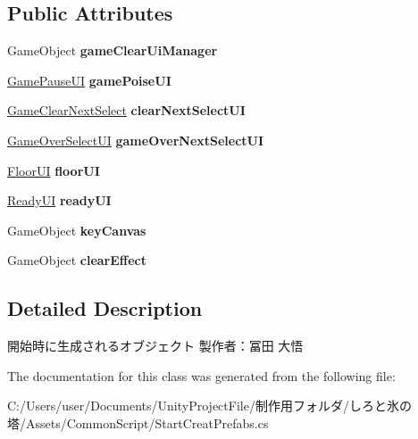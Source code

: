 \subsection*{Public Attributes}
\begin{DoxyCompactItemize}
\item 
\mbox{\label{class_start_creat_prefabs_af8de907bed0306e1273285eb06780123}} 
Game\+Object {\bfseries game\+Clear\+Ui\+Manager}
\item 
\mbox{\label{class_start_creat_prefabs_a4c5321b968367b810da7568fbf7a5613}} 
\hyperlink{class_game_pause_u_i}{Game\+Pause\+UI} {\bfseries game\+Poise\+UI}
\item 
\mbox{\label{class_start_creat_prefabs_a526c5fa91e8e605d8b53c68f52a23058}} 
\hyperlink{class_game_clear_next_select}{Game\+Clear\+Next\+Select} {\bfseries clear\+Next\+Select\+UI}
\item 
\mbox{\label{class_start_creat_prefabs_aae9bdcc165932966a3374c7a2a7c701a}} 
\hyperlink{class_game_over_select_u_i}{Game\+Over\+Select\+UI} {\bfseries game\+Over\+Next\+Select\+UI}
\item 
\mbox{\label{class_start_creat_prefabs_ae049a09c63b35c0f2f9d8a23212b52de}} 
\hyperlink{class_floor_u_i}{Floor\+UI} {\bfseries floor\+UI}
\item 
\mbox{\label{class_start_creat_prefabs_a43c20c81be2cdcd1adfd70adaa209f60}} 
\hyperlink{class_ready_u_i}{Ready\+UI} {\bfseries ready\+UI}
\item 
\mbox{\label{class_start_creat_prefabs_af6466630d6f2ec8b40c65cc566bfda0f}} 
Game\+Object {\bfseries key\+Canvas}
\item 
\mbox{\label{class_start_creat_prefabs_aba51bbbdf74edd928347f536d3ef3b8c}} 
Game\+Object {\bfseries clear\+Effect}
\end{DoxyCompactItemize}


\subsection{Detailed Description}
開始時に生成されるオブジェクト 製作者：冨田 大悟 



The documentation for this class was generated from the following file\+:\begin{DoxyCompactItemize}
\item 
C\+:/\+Users/user/\+Documents/\+Unity\+Project\+File/制作用フォルダ/しろと氷の塔/\+Assets/\+Common\+Script/Start\+Creat\+Prefabs.\+cs\end{DoxyCompactItemize}
